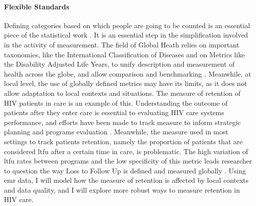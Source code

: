 \paragraph{Flexible Standards} Defining categories based on which people are going to be counted is an essential piece of the statistical work \citep{desrosieres_politique_1993}. It is an essential step in the simplification involved in the activity of measurement. The field of Global Heath relies on important taxonomies, like the International Classification of Diseases and on Metrics like the Disability Adjusted Life Years, to unify description and measurement of health across the globe, and allow comparison and benchmarking \citep{murray_towards_2007,murray_health_2008}. Meanwhile, at local level, the use of globally defined metrics may have its limits, as it does not allow adaptation to local contexts and situations. The measure of retention of HIV patients in care is an example of this. Understanding the outcome of patients after they enter care is essential to evaluating HIV care systems performance, and efforts have been made to track measure to inform strategic planning and programs evaluation   \citep{the_global_fund_global_2014}. Meanwhile, the measure used in most settings to track patients retention, namely the proportion of patients that are considered \gls{ltfu} after a certain time in care, is problematic. The high variation of  \gls{ltfu} rates between programs and the low specificity of this metric leads researcher to question the way Loss to Follow Up is defined and measured globally \citep{chi_universal_2011,yehia_comparing_2012,grimsrud_impact_2013,forster_electronic_2008}. Using \gls{emr} data, I will model how the measure of retention is affected by local contexts and data quality, and I will explore  more robust ways to measure retention in HIV care.

